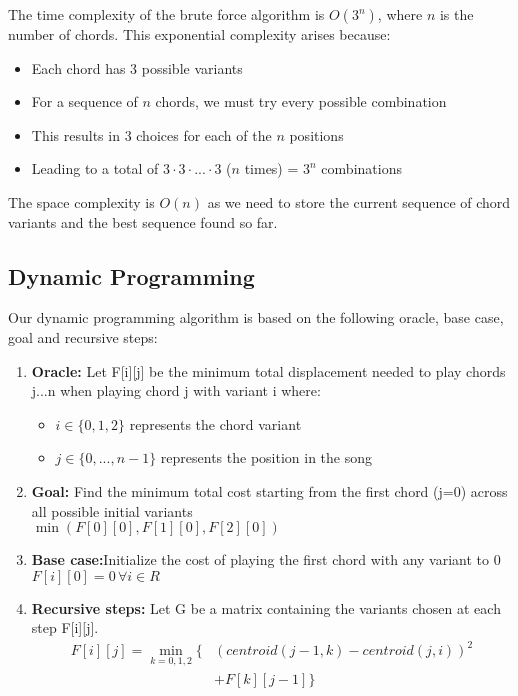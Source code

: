 \documentclass[lettersize,journal]{IEEEtran}
\begin{document}
The time complexity of the brute force algorithm is $O(3^n)$, where $n$ is the number of chords. This exponential complexity arises because:
\begin{itemize}
    \item Each chord has 3 possible variants
    \item For a sequence of $n$ chords, we must try every possible combination
    \item This results in $3$ choices for each of the $n$ positions
    \item Leading to a total of $3 \cdot 3 \cdot ... \cdot 3$ ($n$ times) = $3^n$ combinations
\end{itemize}

The space complexity is $O(n)$ as we need to store the current sequence of chord variants and the best sequence found so far.

\subsection{Dynamic Programming}
Our dynamic programming algorithm is based on the following oracle, base case, goal and recursive steps:

\begin{enumerate}
    \item \textbf{Oracle:} Let F[i][j] be the minimum total displacement needed to play chords j...n when playing chord j with variant i where:
    \begin{itemize}
        \item $i \in \{0,1,2\}$ represents the chord variant
        \item $j \in \{0,...,n-1\}$ represents the position in the song
    \end{itemize}

    \item \textbf{Goal:} Find the minimum total cost starting from the first chord (j=0) across all possible initial variants
    \\
    $\min(F[0][0], F[1][0], F[2][0])$

    \item \textbf{Base case:}Initialize the cost of playing the first chord with any variant to 0
    \\
    $F[i][0] = 0 \, \forall i \in R$

    \item \textbf{Recursive steps:} Let G be a matrix containing the variants chosen at each step F[i][j].
    \[
    \begin{aligned}
    F[i][j] = \min_{k=0,1,2} \{ & (centroid(j-1,k) - centroid(j,i))^2 \\
    & + F[k][j-1] \}
    \end{aligned}
    \]
\end{enumerate}
\end{document}
